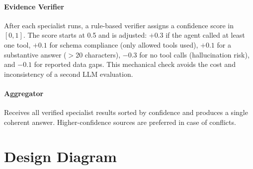 \documentclass[conference]{IEEEtran}
\begin{document}
\paragraph{Evidence Verifier}
After each specialist runs, a rule-based verifier assigns a confidence score in $[0, 1]$.
The score starts at 0.5 and is adjusted: $+0.3$ if the agent called at least one tool,
$+0.1$ for schema compliance (only allowed tools used), $+0.1$ for a substantive answer
($>$20 characters), $-0.3$ for no tool calls (hallucination risk), and $-0.1$ for
reported data gaps.  This mechanical check avoids the cost and inconsistency of a second
LLM evaluation.

\paragraph{Aggregator}
Receives all verified specialist results sorted by confidence and produces a single
coherent answer.  Higher-confidence sources are preferred in case of conflicts.

\section{Design Diagram}
\end{document}
